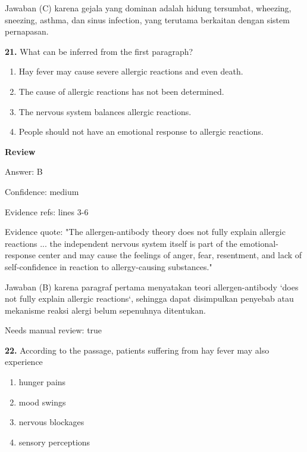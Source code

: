 \documentclass[12pt]{article}
\begin{document}
Jawaban (C) karena gejala yang dominan adalah hidung tersumbat, wheezing, sneezing, asthma, dan sinus infection, yang terutama berkaitan dengan sistem pernapasan.\par
\endgroup
\par
\vspace{0.25\baselineskip}
\noindent\textbf{21.} What can be inferred from the first paragraph?
\begin{enumerate}[label=(\Alph*),leftmargin=*,itemsep=0.2em]
\item Hay fever may cause severe allergic reactions and even death.
\item The cause of allergic reactions has not been determined.
\item The nervous system balances allergic reactions.
\item People should not have an emotional response to allergic reactions.
\end{enumerate}
\par
\begingroup
\setlength{\parskip}{0pt}
\setlength{\parindent}{0pt}
\textbf{Review}\par
Answer: B\par
Confidence: medium\par
Evidence refs: lines 3-6\par
Evidence quote: "The allergen-antibody theory does not fully explain allergic reactions ... the independent nervous system itself is part of the emotional-response center and may cause the feelings of anger, fear, resentment, and lack of self-confidence in reaction to allergy-causing substances."\par
Jawaban (B) karena paragraf pertama menyatakan teori allergen-antibody `does not fully explain allergic reactions`, sehingga dapat disimpulkan penyebab atau mekanisme reaksi alergi belum sepenuhnya ditentukan.\par
Needs manual review: true\par
\endgroup
\par
\vspace{0.25\baselineskip}
\noindent\textbf{22.} According to the passage, patients suffering from hay fever may also experience
\begin{enumerate}[label=(\Alph*),leftmargin=*,itemsep=0.2em]
\item hunger pains
\item mood swings
\item nervous blockages
\item sensory perceptions
\end{enumerate}
\end{document}
